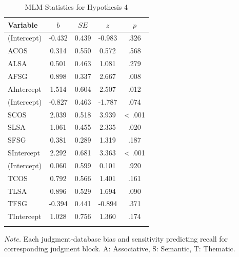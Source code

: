 \documentclass[english,man]{apa6}
\theoremstyle{definition}
\theoremstyle{definition}
\theoremstyle{definition}
\theoremstyle{remark}
\begin{document}
\begin{table}[tbp]
\begin{center}
\begin{threeparttable}
\caption{\label{tab:hyp4-table}MLM Statistics for Hypothesis 4}
\begin{tabular}{lcccc}
\toprule
Variable & \multicolumn{1}{c}{$b$} & \multicolumn{1}{c}{$SE$} & \multicolumn{1}{c}{$z$} & \multicolumn{1}{c}{$p$}\\
\midrule
(Intercept) & -0.432 & 0.439 & -0.983 & .326\\
ACOS & 0.314 & 0.550 & 0.572 & .568\\
ALSA & 0.501 & 0.463 & 1.081 & .279\\
AFSG & 0.898 & 0.337 & 2.667 & .008\\
AIntercept & 1.514 & 0.604 & 2.507 & .012\\
(Intercept) & -0.827 & 0.463 & -1.787 & .074\\
SCOS & 2.039 & 0.518 & 3.939 & < .001\\
SLSA & 1.061 & 0.455 & 2.335 & .020\\
SFSG & 0.381 & 0.289 & 1.319 & .187\\
SIntercept & 2.292 & 0.681 & 3.363 & < .001\\
(Intercept) & 0.060 & 0.599 & 0.101 & .920\\
TCOS & 0.792 & 0.566 & 1.401 & .161\\
TLSA & 0.896 & 0.529 & 1.694 & .090\\
TFSG & -0.394 & 0.441 & -0.894 & .371\\
TIntercept & 1.028 & 0.756 & 1.360 & .174\\
\bottomrule
\addlinespace
\end{tabular}
\begin{tablenotes}[para]
\textit{Note.} Each judgment-database bias and sensitivity predicting recall for corresponding judgment block. A: Associative, S: Semantic, T: Thematic.
\end{tablenotes}
\end{threeparttable}
\end{center}
\end{table}
\end{document}

